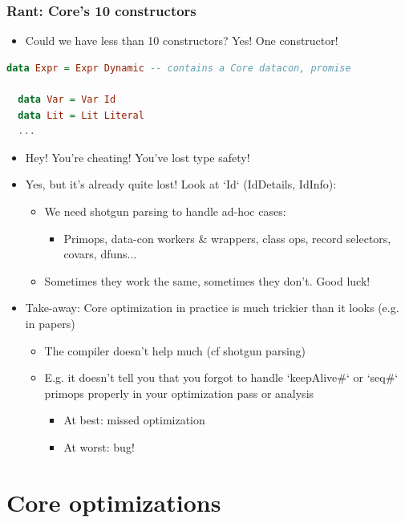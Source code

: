 \documentclass[aspectratio=169]{beamer}
\begin{document}
\begin{frame}[fragile]
  \frametitle{Rant: Core's 10 constructors}
  \begin{itemize}
    \item Could we have less than 10 constructors?
    \pause
     Yes! One constructor!
  \end{itemize}
  \begin{lstlisting}[language=haskell,basicstyle=\small]
  data Expr = Expr Dynamic -- contains a Core datacon, promise

  data Var = Var Id
  data Lit = Lit Literal
  ...
  \end{lstlisting}
  \pause
  \begin{itemize}
    \item Hey! You're cheating! You've lost type safety!
    \pause
    \item Yes, but it's already quite lost! Look at `Id` (IdDetails, IdInfo):
      \begin{itemize}
        \item We need shotgun parsing to handle ad-hoc cases:
        \begin{itemize}
          \item Primops, data-con workers \& wrappers, class ops, record
            selectors, covars, dfuns...
        \end{itemize}
        \item Sometimes they work the same, sometimes they don't. Good luck!
      \end{itemize}
    \pause
    \item Take-away: Core optimization in practice is much trickier than it looks (e.g. in papers)
    \begin{itemize}
      \item The compiler doesn't help much (cf shotgun parsing)
      \item E.g. it doesn't tell you that you forgot to handle `keepAlive\#` or
        `seq\#` primops properly in your optimization pass or analysis
        \begin{itemize}
          \item At best: missed optimization
          \item At worst: bug!
        \end{itemize}
    \end{itemize}
  \end{itemize}
\end{frame}

\section{Core optimizations}
\end{document}

